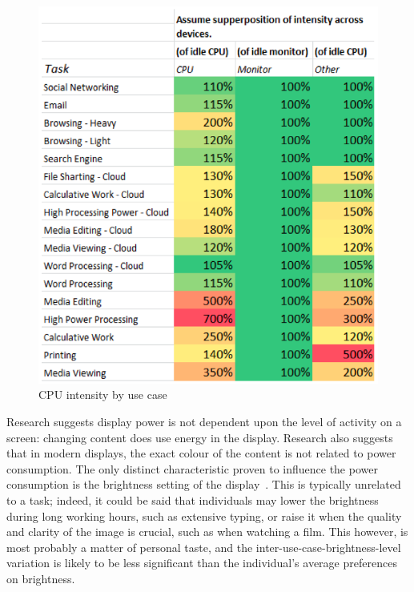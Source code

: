 \documentclass[conference]{IEEEtran}
\begin{document}
\begin{figure}[!ht]
\centering
\includegraphics[width=0.8\columnwidth]{images/cpuintensity_usecase.png}
\caption{CPU intensity by use case}
\label{fig:cpuintensity} 
\end{figure}

Research suggests display power is not dependent upon the level of
activity on a screen: changing content does use energy in the
display. Research also suggests that in modern displays, the exact
colour of the content is not related to power consumption. The only
distinct characteristic proven to influence the power consumption is
the brightness setting of the display~\cite{malmodin-et-al:2014}. This
is typically unrelated to a task; indeed, it could be said that
individuals may lower the brightness during long working hours, such
as extensive typing, or raise it when the quality and clarity of the
image is crucial, such as when watching a film. This however, is most
probably a matter of personal taste, and the
inter-use-case-brightness-level variation is likely to be less
significant than the individual’s average preferences on brightness.
\end{document}
